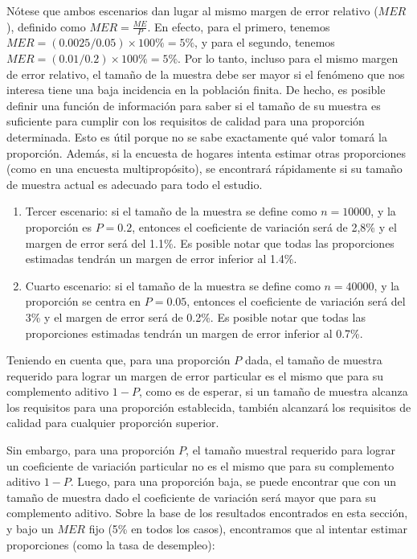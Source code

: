 \documentclass[
  12pt,
]{book}
\begin{document}
Nótese que ambos escenarios dan lugar al mismo margen de error relativo (\(MER\)), definido como \(MER=\frac{ME}{{P}}\). En efecto, para el primero, tenemos \(MER=(0.0025/0.05)\times 100\%=5\%\), y para el segundo, tenemos \(MER=(0.01/0.2)\times 100\%=5\%\). Por lo tanto, incluso para el mismo margen de error relativo, el tamaño de la muestra debe ser mayor si el fenómeno que nos interesa tiene una baja incidencia en la población finita. De hecho, es posible definir una función de información para saber si el tamaño de su muestra es suficiente para cumplir con los requisitos de calidad para una proporción determinada. Esto es útil porque no se sabe exactamente qué valor tomará la proporción. Además, si la encuesta de hogares intenta estimar otras proporciones (como en una encuesta multipropósito), se encontrará rápidamente si su tamaño de muestra actual es adecuado para todo el estudio.

\begin{enumerate}
\def\labelenumi{\arabic{enumi}.}
\setcounter{enumi}{2}
\item
  Tercer escenario: si el tamaño de la muestra se define como \(n = 10000\), y la proporción es \(P=0.2\), entonces el coeficiente de variación será de 2,8\% y el margen de error será del 1.1\%. Es posible notar que todas las proporciones estimadas tendrán un margen de error inferior al 1.4\%.
\item
  Cuarto escenario: si el tamaño de la muestra se define como \(n = 40000\), y la proporción se centra en \(P=0.05\), entonces el coeficiente de variación será del 3\% y el margen de error será de 0.2\%. Es posible notar que todas las proporciones estimadas tendrán un margen de error inferior al 0.7\%.
\end{enumerate}

Teniendo en cuenta que, para una proporción \(P\) dada, el tamaño de muestra requerido para lograr un margen de error particular es el mismo que para su complemento aditivo \(1-P\), como es de esperar, si un tamaño de muestra alcanza los requisitos para una proporción establecida, también alcanzará los requisitos de calidad para cualquier proporción superior.

Sin embargo, para una proporción \(P\), el tamaño muestral requerido para lograr un coeficiente de variación particular no es el mismo que para su complemento aditivo \(1-P\). Luego, para una proporción baja, se puede encontrar que con un tamaño de muestra dado el coeficiente de variación será mayor que para su complemento aditivo. Sobre la base de los resultados encontrados en esta sección, y bajo un \(MER\) fijo (5\% en todos los casos), encontramos que al intentar estimar proporciones (como la tasa de desempleo):
\end{document}
